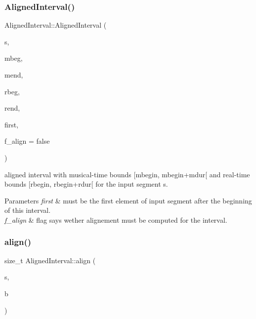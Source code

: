 \subsubsection{\texorpdfstring{AlignedInterval()}{AlignedInterval()}\hspace{0.1cm}{\footnotesize\ttfamily [2/2]}}
{\footnotesize\ttfamily Aligned\+Interval\+::\+Aligned\+Interval (\begin{DoxyParamCaption}\item[{const \mbox{\hyperlink{classInputSegment}{Input\+Segment}} $\ast$}]{s,  }\item[{\mbox{\hyperlink{classRational}{Rational}}}]{mbeg,  }\item[{\mbox{\hyperlink{classRational}{Rational}}}]{mend,  }\item[{double}]{rbeg,  }\item[{double}]{rend,  }\item[{size\+\_\+t}]{first,  }\item[{bool}]{f\+\_\+align = {\ttfamily false} }\end{DoxyParamCaption})\hspace{0.3cm}{\ttfamily [protected]}}



aligned interval with musical-\/time bounds \mbox{[}mbegin, mbegin+mdur\mbox{[} and real-\/time bounds \mbox{[}rbegin, rbegin+rdur\mbox{[} for the input segment s. 


\begin{DoxyParams}{Parameters}
{\em first} & must be the first element of input segment after the beginning of this interval.\\
\hline
{\em f\+\_\+align} & flag says wether alignement must be computed for the interval. \\
\hline
\end{DoxyParams}
\mbox{\label{group__segment_ga25f42094dbb3623c73df11dd85596185}} 
\subsubsection{\texorpdfstring{align()}{align()}}
{\footnotesize\ttfamily size\+\_\+t Aligned\+Interval\+::align (\begin{DoxyParamCaption}\item[{const \mbox{\hyperlink{classInputSegment}{Input\+Segment}} $\ast$}]{s,  }\item[{size\+\_\+t}]{b }\end{DoxyParamCaption})}




